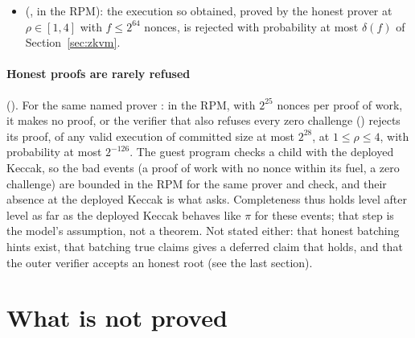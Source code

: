 \documentclass[11pt]{article}
\begin{document}
\begin{itemize}
$2752$ leanXMSS or $1002$ leanSPHINCS signatures (each declared once), and a node holding one DA
matrix directly with up to $58$ rows. On leanVM's own aggregations of $16$ and $32$ blobs the
budget's size was the measured committed size, $2^{26.486}$ and $2^{27.482}$ (at leanVM
\texttt{990b9352}, \texttt{93ebecc5}, \texttt{c445e3d5} and \texttt{1e9d8cff} alike); at
\texttt{1a379148}, \texttt{9d8bce81}, \texttt{834e6614}, \texttt{d1c4c8f7} and \texttt{5e3ade21}, not re-measured, the budget gives $2^{26.494}$ and $2^{27.482}$, and at \texttt{40f877dc}, whose \texttt{KECCAK} table commits two more columns, $2^{26.496}$ and $2^{27.484}$.
\item {} (, in the RPM): the execution so obtained,
proved by the honest prover at $\rho \in [1,4]$ with $f \le 2^{64}$ nonces, is rejected with
probability at most $\delta(f)$ of Section~\ref{sec:zkvm}.
\end{itemize}

\paragraph{Honest proofs are rarely refused} (). For the same named
prover : in the RPM, with $2^{25}$ nonces per proof of work, it
makes no proof, or the verifier that also refuses every zero challenge ()
rejects its proof, of any valid execution of committed size at most $2^{28}$, at $1 \le \rho \le 4$,
with probability at most $2^{-126}$. The guest program checks a child with the deployed Keccak, so
the bad events (a proof of work with no nonce within its fuel, a zero challenge) are bounded in the
RPM for the same prover and check, and their absence at the deployed Keccak is what
 asks. Completeness thus holds level after level as far as the deployed Keccak
behaves like $\pi$ for these events; that step is the model's assumption, not a theorem. Not stated
either: that honest batching hints exist, that batching true claims gives a deferred claim that
holds, and that the outer verifier accepts an honest root (see the last section).

\section{What is not proved}
\end{document}

